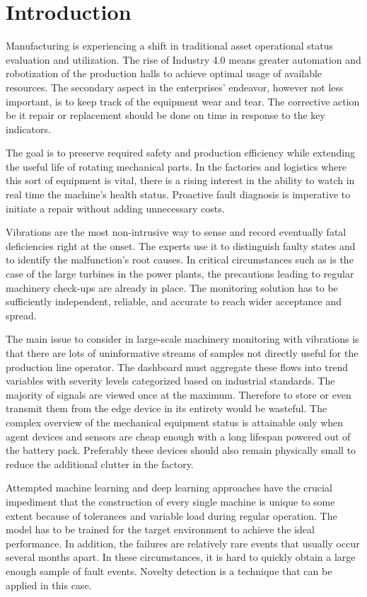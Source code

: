 \chapter{Introduction}
Manufacturing is experiencing a shift in traditional asset operational status evaluation and utilization. The rise of Industry 4.0 means greater automation and robotization of the production halls to achieve optimal usage of available resources. The secondary aspect in the enterprises' endeavor, however not less important, is to keep track of the equipment wear and tear. The corrective action be it repair or replacement should be done on time in response to the key indicators.

The goal is to preserve required safety and production efficiency while extending the useful life of rotating mechanical parts. In the factories and logistics where this sort of equipment is vital, there is a rising interest in the ability to watch in real time the machine's health status. Proactive fault diagnosis is imperative to initiate a repair without adding unnecessary costs.

Vibrations are the most non-intrusive way to sense and record eventually fatal deficiencies right at the onset. The experts use it to distinguish faulty states and to identify the malfunction's root causes. In critical circumstances such as is the case of the large turbines in the power plants, the precautions leading to regular machinery check-ups are already in place. The monitoring solution has to be sufficiently independent, reliable, and accurate to reach wider acceptance and spread.

The main issue to consider in large-scale machinery monitoring with vibrations is that there are lots of uninformative streams of samples not directly useful for the production line operator. The dashboard must aggregate these flows into trend variables with severity levels categorized based on industrial standards. The majority of signals are viewed once at the maximum. Therefore to store or even transmit them from the edge device in its entirety would be wasteful. The complex overview of the mechanical equipment status is attainable only when agent devices and sensors are cheap enough with a long lifespan powered out of the battery pack. Preferably these devices should also remain physically small to reduce the additional clutter in the factory.

Attempted machine learning and deep learning approaches have the crucial impediment that the construction of every single machine is unique to some extent because of tolerances and variable load during regular operation. The model has to be trained for the target environment to achieve the ideal performance. In addition, the failures are relatively rare events that usually occur several months apart. In these circumstances, it is hard to quickly obtain a large enough sample of fault events. Novelty detection is a technique that can be applied in this case.

